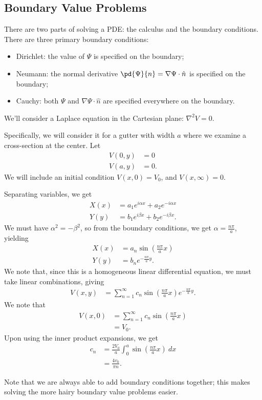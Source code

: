 \documentclass[10pt]{mypackage}
\begin{document}
  \subsection{Boundary Value Problems}%
  There are two parts of solving a PDE: the calculus and the boundary conditions. There are three primary boundary conditions:
  \begin{itemize}
    \item Dirichlet: the value of $\Psi$ is specified on the boundary;
    \item Neumann: the normal derivative $\pd{\Psi}{n} = \nabla\Psi\cdot \hat{n}$ is specified on the boundary;
    \item Cauchy: both $\Psi$ and $\nabla\Psi\cdot \hat{n}$ are specified everywhere on the boundary.
  \end{itemize}
  \begin{example}
    We'll consider a Laplace equation in the Cartesian plane: $\nabla^2 V = 0.$\newline

    Specifically, we will consider it for a gutter with width $a$ where we examine a cross-section at the center. Let
    \begin{align*}
      V\left( 0,y \right) &= 0\\
      V\left( a,y \right) &= 0.
    \end{align*}
    We will include an initial condition $V\left( x,0 \right) = V_0$, and $V\left( x,\infty \right) = 0$.\newline

    Separating variables, we get
    \begin{align*}
      X(x) &= a_1e^{i\alpha x} + a_2e^{-i\alpha x}\\
      Y(y) &= b_1e^{i\beta x} + b_2e^{-i\beta x}.
    \end{align*}
    We must have $\alpha^2 = -\beta^2$, so from the boundary conditions, we get $\alpha = \frac{n\pi}{a}$, yielding
    \begin{align*}
      X(x) &= a_n\sin\left( \frac{n\pi }{a}x \right)\\
      Y(y) &= b_ne^{-\frac{n\pi}{a}y}.
    \end{align*}
    We note that, since this is a homogeneous linear differential equation, we must take linear combinations, giving
    \begin{align*}
      V\left( x,y \right) &= \sum_{n=1}^{\infty}c_n\sin\left( \frac{n\pi}{a}x \right)e^{-\frac{n\pi}{a}y}.
    \end{align*}
    We note that
    \begin{align*}
      V\left( x,0 \right) &= \sum_{n=1}^{\infty}c_n\sin\left( \frac{n\pi}{a}x \right)\\
                          &= V_0.
    \end{align*}
    Upon using the inner product expansions, we get
    \begin{align*}
      c_n &= \frac{2V_0}{a} \int_{0}^{a} \sin\left( \frac{n\pi}{a}x \right)\:dx\\
          &= \frac{4v_0}{\pi n}.\tag*{for odd $n$}
    \end{align*}
  \end{example}
  Note that we are always able to add boundary conditions together; this makes solving the more hairy boundary value problems easier.
\end{document}
